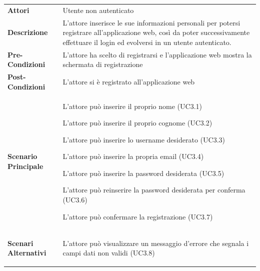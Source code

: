 \begin{longtable}{ l | p{11cm}}
	\hline
	\rowcolor{Gray}
	 \multicolumn{2}{c}{UC3 - Registrazione utente} \\
	 \hline
	\textbf{Attori} & Utente non autenticato \\
	\textbf{Descrizione} & L'attore inserisce le sue informazioni personali per potersi registrare all'applicazione web, così da poter successivamente effettuare il login ed evolversi in un utente autenticato. \\
	\textbf{Pre-Condizioni} & L'attore ha scelto di registrarsi e l'applicazione web mostra la schermata di registrazione \\
	\textbf{Post-Condizioni} & L'attore si è registrato all'applicazione web \\
	\textbf{Scenario Principale} & 
	\begin{enumerate*}[label=(\arabic*.),itemjoin={\newline}]
		\item L'attore può inserire il proprio nome (UC3.1)
		\item L'attore può inserire il proprio cognome (UC3.2)
		\item L'attore può inserire lo username desiderato (UC3.3)
		\item L'attore può inserire la propria email (UC3.4) 
		\item L'attore può inserire la password desiderata (UC3.5)
		\item L'attore può reinserire la password desiderata per conferma (UC3.6)
		\item L'attore può confermare la registrazione (UC3.7)
	\end{enumerate*}\\
	\textbf{Scenari Alternativi} & 
	\begin{enumerate*}[label=(\arabic*.),itemjoin={\newline}]
		\item L'attore può visualizzare un messaggio d'errore che segnala i campi dati non validi (UC3.8)
	\end{enumerate*}\\
\end{longtable}